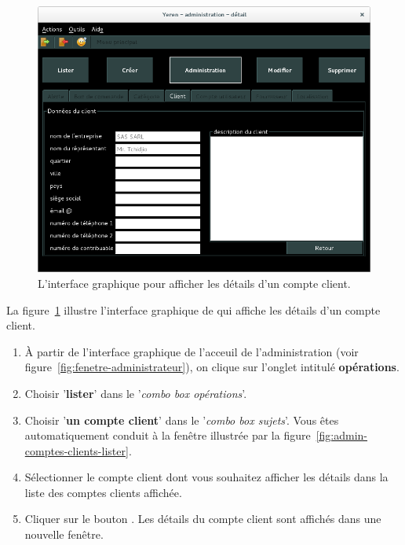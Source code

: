 

\begin{figure}[!htpb]
	\centering
	\includegraphics[scale=0.45]{images/compte-client-afficher-details.png}
	\caption{L'interface graphique pour afficher les d\'etails d'un compte client.}
	\label{fig:admin-compte-client-afficher-details}
\end{figure}

La figure~\ref{fig:admin-compte-client-afficher-details}
illustre l'interface graphique de \yeren qui affiche les
d\'etails d'un compte client.

\begin{enumerate}[1)]
	\item \`A partir de l'interface graphique de l'acceuil de
		l'administration (voir figure~\ref{fig:fenetre-administrateur}),
		on clique sur l'onglet intitul\'e \textbf{op\'erations}. 
		
	\item Choisir '\textbf{lister}' dans le '\emph{combo box
		op\'erations}'.
		
	\item Choisir '\textbf{un compte client}' dans le '\emph{combo box
		sujets}'. Vous \^etes automatiquement conduit \`a la fen\^etre
		illustr\'ee par la figure~\ref{fig:admin-comptes-clients-lister}.
		
	\item S\'electionner le compte client dont vous souhaitez afficher
		les d\'etails dans la liste des comptes clients affich\'ee.
		
	\item Cliquer sur le bouton . Les d\'etails
		du compte client sont affich\'es dans une nouvelle fen\^etre.
\end{enumerate}

